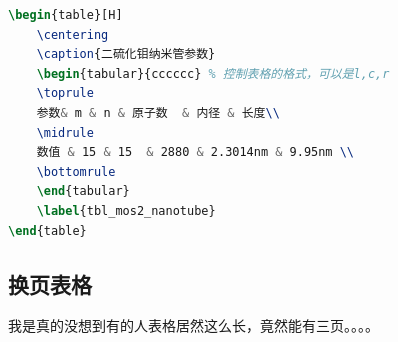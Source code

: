 \documentclass[AutoFakeBold]{LZUThesis}
\begin{document}
\begin{lstlisting}[language = tex]
\begin{table}[H]
    \centering
    \caption{二硫化钼纳米管参数}
    \begin{tabular}{cccccc} % 控制表格的格式，可以是l,c,r
    \toprule
    参数& m & n & 原子数  & 内径 & 长度\\
    \midrule
    数值 & 15 & 15  & 2880 & 2.3014nm & 9.95nm \\
    \bottomrule
    \end{tabular}
    \label{tbl_mos2_nanotube}
\end{table}
\end{lstlisting}

\subsection{换页表格} %

我是真的没想到有的人表格居然这么长，竟然能有三页。。。。
\end{document}
